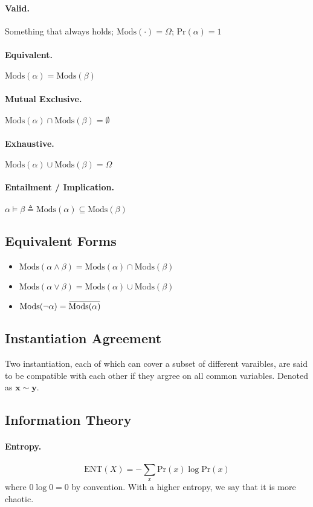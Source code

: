 \documentclass[11pt]{article}
\newcommand{\bx}{\mathbf{x}}
\newcommand{\by}{\mathbf{y}}
\newcommand{\largeover}[1]{\mkern 1.5mu\overline{\mkern-1.5mu#1\mkern-1.5mu}\mkern 1.5mu}
\newcommand{\mods}{\mathrm{Mods}}
\newcommand{\pr}{\mathrm{Pr}}
\newcommand{\ent}{\mathrm{ENT}}
\begin{document}
\paragraph{Valid.} Something that always holds; $\mods (\cdot) = \Omega$; $\pr (\alpha) = 1$
\paragraph{Equivalent.} $\mods (\alpha) = \mods (\beta)$
\paragraph{Mutual Exclusive.} $\mods(\alpha) \cap \mods (\beta) = \emptyset$
\paragraph{Exhaustive.} $\mods (\alpha) \cup \mods (\beta) = \Omega$
\paragraph{Entailment / Implication.} $\alpha \vDash \beta \triangleq \mods (\alpha) \subseteq \mods ( \beta)$

\subsection{Equivalent Forms}
\begin{itemize}
\item $\mods( \alpha \land \beta) = \mods( \alpha) \cap \mods(\beta)$
\item $\mods( \alpha \vee \beta) = \mods ( \alpha) \cup \mods ( \beta)$
\item $\mods ( \neg \alpha) = \largeover{\mods ( \alpha)}$
\end{itemize}

\subsection{Instantiation Agreement}
Two instantiation, each of which can cover a subset of different varaibles, are said to be compatible with each other if they argree on all common variables. Denoted as $\bx \sim \by$.

\subsection{Information Theory}
\paragraph{Entropy.} 
\begin{equation}
\ent  (X) = - \sum_x \pr (x) \log \pr( x)
\end{equation}
where $0 \log 0 = 0 $ by convention. With a higher entropy, we say that it is more chaotic. 
\end{document}

